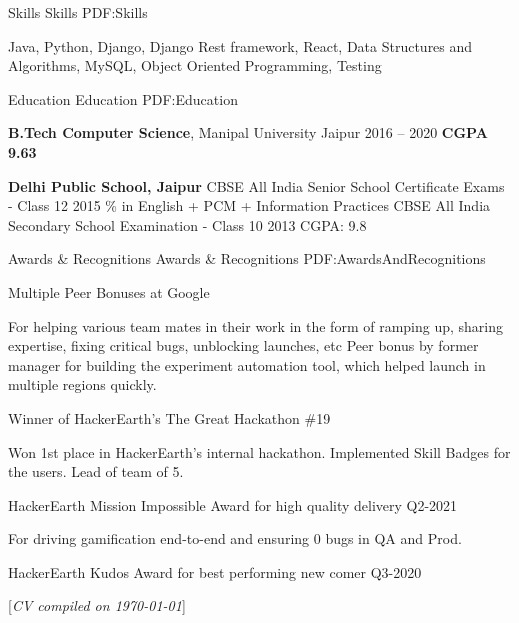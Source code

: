 \documentclass[letterpaper,MMMyyyy,nonstopmode]{simpleresumecv}
\newcommand{\CVNote}{CV compiled on {\today}}
\begin{document}
\begin{Body}

\Section
{Skills}
{Skills}
{PDF:Skills}

\Entry
Java,
Python,
Django,
Django Rest framework,
React,
Data Structures and Algorithms,
MySQL,
Object Oriented Programming,
Testing

\Section
{Education}
{Education}
{PDF:Education}

\Entry
\textbf{B.Tech Computer Science}, Manipal University Jaipur
\hfill  2016 -- 2020
\BulletItem
\textbf{CGPA 9.63}

\BigGap
\Entry
\textbf{Delhi Public School, Jaipur}
\BulletItem
CBSE All India Senior School Certificate Exams - Class 12
\hfill 2015
\% in English + PCM + Information Practices
\Gap
\BulletItem
CBSE All India Secondary School Examination - Class 10
\hfill 2013
\SubBulletItem
CGPA: 9.8


\Section
{Awards \&\newline
Recognitions}
{Awards \& Recognitions}
{PDF:AwardsAndRecognitions}

\BulletItem
Multiple Peer Bonuses at Google
\begin{Detail}
\Item
For helping various team mates in their work in the form of ramping up, sharing expertise, fixing critical bugs, unblocking launches, etc
\Item
Peer bonus by former manager for building the experiment automation tool, which helped launch in multiple regions quickly. 
\end{Detail}

\BulletItem
Winner of HackerEarth's The Great Hackathon \#19
\begin{Detail}
\Item
Won 1st place in HackerEarth's internal hackathon. Implemented Skill
Badges for the users. Lead of team of 5.
\end{Detail}

\BulletItem
HackerEarth Mission Impossible Award for high quality delivery Q2-2021
\begin{Detail}
\Item
For driving gamification end-to-end and ensuring 0 bugs in QA and Prod.
\end{Detail}

\BulletItem
HackerEarth Kudos Award for best performing new comer Q3-2020

\end{Body}

\BigGap
\UseNoteFont%
\null\hfill%
[\textit{\CVNote}]
\end{document}
